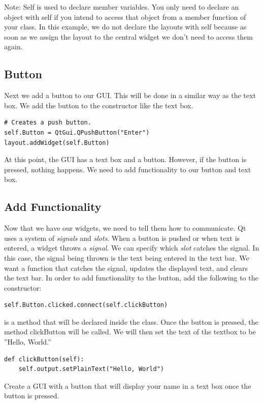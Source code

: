 Note: Self is used to declare member variables.  You only need to declare an object with self if you intend to access that object from a member function of your class.  In this example, we do not declare the layouts with self because as soon as we assign the layout to the central widget we don't need to access them again.

\subsection*{Button}
Next we add a button to our GUI.  This will be done in a similar way as the text box.  We add the button to the constructor like the text box.
\begin{lstlisting}
# Creates a push button.
self.Button = QtGui.QPushButton("Enter")
layout.addWidget(self.Button)
\end{lstlisting}
At this point, the GUI has a text box and a button.  However, if the button is pressed, nothing happens.  We need to add functionality to our button and text box.
\subsection*{Add Functionality}
Now that we have our widgets, we need to tell them how to communicate.
Qt uses a system of \emph{signals} and \emph{slots}.
When a button is pushed or when text is entered, a widget throws a \emph{signal}.
We can specify which \emph{slot} catches the signal.
In this case, the signal being thrown is the text being entered in the text bar. We want a function that catches the signal, updates the displayed text, and clears the text bar.  In order to add functionality to the button, add the following to the constructor:
\begin{lstlisting}
self.Button.clicked.connect(self.clickButton)
\end{lstlisting}
 is a method that will be declared inside the  class.  Once the button is pressed, the method clickButton will be called.  We will then set the text of the textbox to be ''Hello, World.''
\begin{lstlisting}
def clickButton(self):
	self.output.setPlainText("Hello, World")
\end{lstlisting}
\begin{problem}
Create a GUI with a button that will display your name in a text box once the button is pressed.
\label{prob:basicGUI}
\end{problem}

